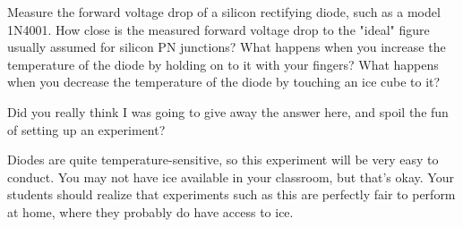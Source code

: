 

Measure the forward voltage drop of a silicon rectifying diode, such as a model 1N4001.  How close is the measured forward voltage drop to the "ideal" figure usually assumed for silicon PN junctions?  What happens when you increase the temperature of the diode by holding on to it with your fingers?  What happens when you decrease the temperature of the diode by touching an ice cube to it?







Did you really think I was going to give away the answer here, and spoil the fun of setting up an experiment?







Diodes are quite temperature-sensitive, so this experiment will be very easy to conduct.  You may not have ice available in your classroom, but that's okay.  Your students should realize that experiments such as this are perfectly fair to perform at home, where they probably do have access to ice.




